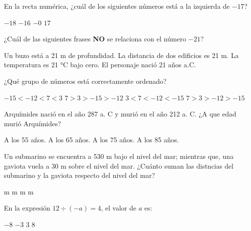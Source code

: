 \documentclass[spanish,letterpaper, 12pt, addpoints, answers]{exam}
\begin{document}
\begin{questions}
    \newpage
    \question[1] En la recta numérica, ¿cuál de los siguientes números está a la izquierda de $-17$?
    \begin{choices}
        \CorrectChoice $-18$
        \choice $-16$
        \choice $-0$
        \choice $17$
    \end{choices}
    \vspace{0.15in}

    \question[1] ¿Cuál de las siguientes frases \textbf{NO} se relaciona con el número $-21$?
    \begin{choices}
        \choice Un buzo está a 21 m de profundidad.
        \CorrectChoice La distancia de dos edificios es 21 m.
        \choice La temperatura es 21 °C bajo cero.
        \choice El personaje nació 21 años a.C.
    \end{choices}
    \vspace{0.15in}

    \question[1] ¿Qué grupo de números está correctamente ordenado?
    \begin{choices}
        \choice $-15<-12<7<3$
        \choice $7>3>-15>-12$
        \choice $3<7<-12<-15$
        \CorrectChoice $7>3>-12>-15$
    \end{choices}
    \vspace{0.15in}

    \question[1] Arquímides nació en el año 287 a. C y murió en el año 212 a. C. ¿A que edad murió Arquímides?
    \begin{choices}
        \choice A los 55 años.
        \choice A los 65 años.
        \CorrectChoice A los 75 años.
        \choice A los 85 años.
    \end{choices}
    \vspace{0.15in}

    \question[1] Un submarino se encuentra a 530 m bajo el nivel del mar; mientras que, una gaviota vuela a 30 m sobre el nivel del mar. ¿Cuánto suman las distncias del submarino y la gaviota respecto del nivel del mar?
    \begin{choices}
         m
         m
         m
         m
    \end{choices}
    \vspace{0.15in}

    \newpage
    \question[1] En la expresión $12\div (-a)=4$, el valor de $a$ es:
    \begin{choices}
        \choice $-8$
        \CorrectChoice $-3$
        \choice $3$
        \choice $8$
    \end{choices}
    \vspace{0.15in}


\end{questions}
\end{document}
